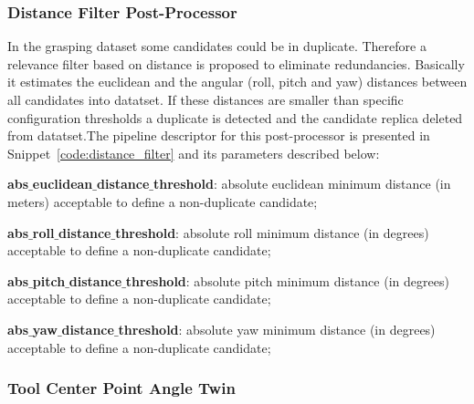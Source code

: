 \subsubsection{Distance Filter Post-Processor}
\label{cap4:modular_grasping_architecture:sec:grasping_synthesis:subsec:postprocessor:subsubsec:distance_filter}

In the grasping dataset some candidates could be in duplicate. Therefore a relevance filter based on distance is proposed to eliminate redundancies. Basically it estimates the euclidean and the angular (roll, pitch and yaw) distances between all candidates into datatset. If these distances are smaller than specific configuration thresholds a duplicate is detected and the candidate replica deleted from datatset.The pipeline descriptor for this post-processor is presented in Snippet~\ref{code:distance_filter} and its parameters described below:

\begin{snippet}
\centering
{}
\end{snippet}

\begin{itemize_jp}
    \item \textbf{abs$\_$euclidean$\_$distance$\_$threshold}: absolute euclidean minimum distance (in meters) acceptable to define a non-duplicate candidate;  
    \item \textbf{abs$\_$roll$\_$distance$\_$threshold}: absolute roll minimum distance (in degrees) acceptable to define a non-duplicate candidate; 
    \item \textbf{abs$\_$pitch$\_$distance$\_$threshold}: absolute pitch minimum distance (in degrees) acceptable to define a non-duplicate candidate; 
    \item \textbf{abs$\_$yaw$\_$distance$\_$threshold}: absolute yaw minimum distance (in degrees) acceptable to define a non-duplicate candidate;
\end{itemize_jp}

\subsubsection{Tool Center Point Angle Twin}
\label{cap4:modular_grasping_architecture:sec:grasping_synthesis:subsec:postprocessor:subsubsec:tcp_angle_twin}

